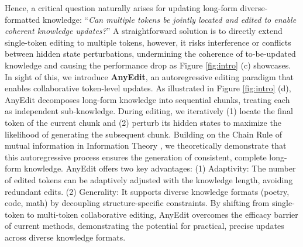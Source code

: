 Hence, a critical question naturally arises for updating long-form diverse-formatted knowledge: ``\textit{Can multiple tokens be jointly located and edited to enable coherent knowledge updates?}'' A straightforward solution is to directly extend single-token editing to multiple tokens, however, it risks interference or conflicts between hidden state perturbations, undermining the coherence of to-be-updated knowledge and causing the performance drop as Figure \ref{fig:intro} (c) showcases. In sight of this, we introduce \textbf{AnyEdit}, an autoregressive editing paradigm that enables collaborative token-level updates. As illustrated in Figure \ref{fig:intro} (d), AnyEdit decomposes long-form knowledge into sequential chunks, treating each as independent sub-knowledge. During editing, we iteratively (1) locate the final token of the current chunk and (2) perturb its hidden states to maximize the likelihood of generating the subsequent chunk. Building on the Chain Rule of mutual information \cite{mutual_information} in Information Theory \cite{information}, we theoretically demonstrate that this autoregressive process ensures the generation of consistent, complete long-form knowledge. AnyEdit offers two key advantages:
(1) Adaptivity: The number of edited tokens can be adaptively adjusted with the knowledge length, avoiding redundant edits.
(2) Generality: It supports diverse knowledge formats (\eg poetry, code, math) by decoupling structure-specific constraints. By shifting from single-token to multi-token collaborative editing, AnyEdit overcomes the efficacy barrier of current methods, demonstrating the potential for practical, precise updates across diverse knowledge formats.




